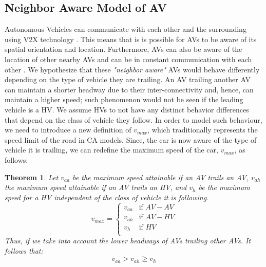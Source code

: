 \documentclass[oneside,letter,11pt]{article}
\newtheorem{theorem}{Theorem}
\begin{document}
\subsection{Neighbor Aware Model of AV}\label{ss:1}
Autonomous Vehicles can communicate with each other and the surrounding using V2X technology \cite{v2v}. This means that is is possible for AVs to be aware of its spatial orientation and location. Furthermore, AVs can also be aware of the location of other nearby AVs and can be in constant communication with each other \cite{v2x}. We hypothesize that these \textit{"neighbor aware"} AVs would behave differently depending on the type of vehicle they are trailing. An AV trailing another AV can maintain a shorter headway due to their inter-connectivity and, hence, can maintain a higher speed; such phenomenon would not be seen if the leading vehicle is a HV. We assume HVs to not have any distinct behavior differences that depend on the class of vehicle they follow. In order to model such behaviour, we need to introduce a new definition of $v_{max}$, which traditionally represents the speed limit of the road in CA models. Since, the car is now aware of the type of vehicle it is trailing, we can redefine the maximum speed of the car, $v_{max}$, as follows:

\begin{theorem}\label{th1} Let $v_{aa}$ be the maximum speed attainable if an AV trails an AV, $v_{ah}$ the maximum speed attainable if an AV trails an HV, and $v_h$ be the maximum speed for a HV independent of the class of vehicle it is following.
\begin{equation}
    \label{eq:v}
        v_{max}=
        \left\{ \begin{array}{ll}
            v_{aa} &\text{if } AV-AV \\
            v_{ah} &\text{if } AV-HV \\
            v_{h} &\text{if } HV \\
        \end{array} \right.
\end{equation}
Thus, if we take into account the lower headways of AVs trailing other AVs. It follows that:
\begin{equation}
    \label{eq:cond}
    v_{aa} > v_{ah} \geq v_{h}
\end{equation}
\end{theorem}

\end{document}
